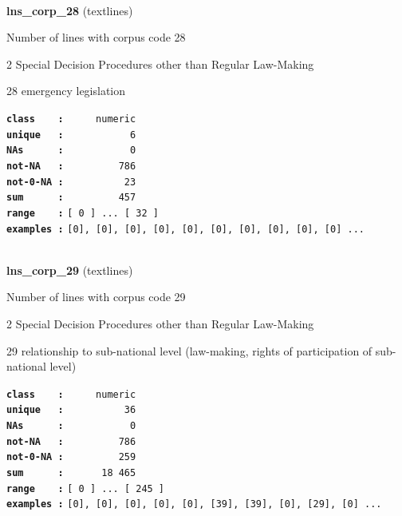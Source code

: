 \documentclass[]{article}
\begin{document}
~

\textbf{lns\_corp\_28} (textlines)

Number of lines with corpus code 28

2 Special Decision Procedures other than Regular Law-Making

28 emergency legislation

\textbf{\texttt{class\ \ \ \ :}} \texttt{~~~~~numeric}\\
\textbf{\texttt{unique\ \ \ :}} \texttt{~~~~~~~~~~~6}\\
\textbf{\texttt{NAs\ \ \ \ \ \ :}} \texttt{~~~~~~~~~~~0}\\
\textbf{\texttt{not-NA\ \ \ :}} \texttt{~~~~~~~~~786}\\
\textbf{\texttt{not-0-NA\ :}} \texttt{~~~~~~~~~~23}\\
\textbf{\texttt{sum\ \ \ \ \ \ :}} \texttt{~~~~~~~~~457}\\
\textbf{\texttt{range\ \ \ \ :}}
\texttt{{[}\ 0\ {]}\ ...\ {[}\ 32\ {]}}\\
\textbf{\texttt{examples\ :}}
\texttt{{[}0{]},\ {[}0{]},\ {[}0{]},\ {[}0{]},\ {[}0{]},\ {[}0{]},\ {[}0{]},\ {[}0{]},\ {[}0{]},\ {[}0{]}\ ...}\\

~

\textbf{lns\_corp\_29} (textlines)

Number of lines with corpus code 29

2 Special Decision Procedures other than Regular Law-Making

29 relationship to sub-national level (law-making, rights of
participation of sub-national level)

\textbf{\texttt{class\ \ \ \ :}} \texttt{~~~~~numeric}\\
\textbf{\texttt{unique\ \ \ :}} \texttt{~~~~~~~~~~36}\\
\textbf{\texttt{NAs\ \ \ \ \ \ :}} \texttt{~~~~~~~~~~~0}\\
\textbf{\texttt{not-NA\ \ \ :}} \texttt{~~~~~~~~~786}\\
\textbf{\texttt{not-0-NA\ :}} \texttt{~~~~~~~~~259}\\
\textbf{\texttt{sum\ \ \ \ \ \ :}} \texttt{~~~~~~18~465}\\
\textbf{\texttt{range\ \ \ \ :}}
\texttt{{[}\ 0\ {]}\ ...\ {[}\ 245\ {]}}\\
\textbf{\texttt{examples\ :}}
\texttt{{[}0{]},\ {[}0{]},\ {[}0{]},\ {[}0{]},\ {[}0{]},\ {[}39{]},\ {[}39{]},\ {[}0{]},\ {[}29{]},\ {[}0{]}\ ...}\\
\end{document}
